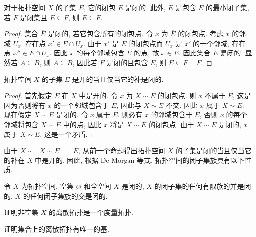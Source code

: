 \documentclass[../../main.tex]{subfiles}
\begin{document}
\begin{proposition}\label{proposition:ch11-闭包最小}
对于拓扑空间 $X$ 的子集 $E$, 它的闭包 $\overline{E}$ 是闭的. 此外, $\overline{E}$ 是包含 $E$ 的最小闭子集, 若 $F$ 是闭集且 $E\subseteq F$, 则 $\overline{E}\subseteq F$.
\end{proposition}

\begin{proof}
集合 $\overline{E}$ 是闭的, 若它包含所有的闭包点. 令 $x$ 为 $\overline{E}$ 的闭包点. 考虑 $x$ 的邻域 $U_{x}$. 存在点 $x'\in E\cap U_{x}$. 由于 $x'$ 是 $E$ 的闭包点而 $U_{x}$ 是 $x'$ 的一个邻域, 存在点 $x''\in E\cap U_{x}$. 因此 $x$ 的每个邻域包含 $E$ 的点, 故 $x\in\overline{E}$. 因此集合 $\overline{E}$ 是闭的. 显然若 $A\subseteq B$, 则 $\overline{A}\subseteq\overline{B}$, 因此若 $F$ 是闭的且包含 $E$, 则 $\overline{E}\subseteq\overline{F}=F$.
\end{proof}

\begin{proposition}\label{proposition:ch11-开集补集}
拓扑空间 $X$ 的子集 $E$ 是开的当且仅当它的补是闭的.
\end{proposition}

\begin{proof}
首先假定 $E$ 在 $X$ 中是开的. 令 $x$ 为 $X\sim E$ 的闭包点. 则 $x$ 不属于 $E$, 这是因为否则将有 $x$ 的一个邻域包含于 $E$, 因此与 $X\sim E$ 不交. 因此 $x$ 属于 $X\sim E$. 现在假定 $X\sim E$ 是闭的. 令 $x$ 属于 $E$. 则必有 $x$ 的邻域包含于 $E$, 否则 $x$ 的每个邻域将包含 $X\sim E$ 中的点, 因此 $x$ 将是 $X\sim E$ 的闭包点. 由于 $X\sim E$ 是闭的, $x$ 属于 $X\sim E$. 这是一个矛盾.
\end{proof}

由于 $X\sim[X\sim E]=E$, 从前一个命题得出拓扑空间 $X$ 的子集是闭的当且仅当它的补在 $X$ 中是开的. 因此, 根据 De Morgan 等式, 拓扑空间的闭子集族具有以下性质.

\begin{proposition}\label{proposition:ch11-闭集性质}
令 $X$ 为拓扑空间. 空集 $\varnothing$ 和全空间 $X$ 是闭的, $X$ 的闭子集的任何有限族的并是闭的, $X$ 的任何闭子集族的交是闭的.
\end{proposition}

\begin{exercise}\label{exercise:ch11-01}
证明非空集 $X$ 的离散拓扑是一个度量拓扑.
\end{exercise}

\begin{exercise}\label{exercise:ch11-02}
证明集合上的离散拓扑有唯一的基.
\end{exercise}
\end{document}
